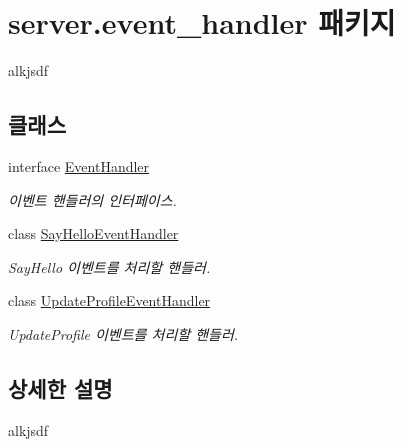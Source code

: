 \hypertarget{namespaceserver_1_1event__handler}{\section{server.\-event\-\_\-handler 패키지}
\label{namespaceserver_1_1event__handler}
}


alkjsdf  


\subsection*{클래스}
\begin{DoxyCompactItemize}
\item 
interface \hyperlink{interfaceserver_1_1event__handler_1_1_event_handler}{Event\-Handler}
\begin{DoxyCompactList}\small\item\em 이벤트 핸들러의 인터페이스. \end{DoxyCompactList}\item 
class \hyperlink{classserver_1_1event__handler_1_1_say_hello_event_handler}{Say\-Hello\-Event\-Handler}
\begin{DoxyCompactList}\small\item\em Say\-Hello 이벤트를 처리할 핸들러. \end{DoxyCompactList}\item 
class \hyperlink{classserver_1_1event__handler_1_1_update_profile_event_handler}{Update\-Profile\-Event\-Handler}
\begin{DoxyCompactList}\small\item\em Update\-Profile 이벤트를 처리할 핸들러. \end{DoxyCompactList}\end{DoxyCompactItemize}


\subsection{상세한 설명}
alkjsdf 